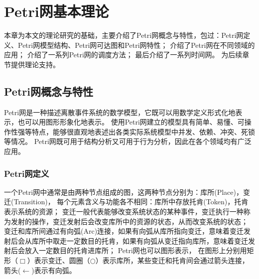\chapter{Petri网基本理论}
本章为本文的理论研究的基础，主要介绍了Petri网概念与特性，包过：Petri网定义、Petri网模型结构、Petri网可达图和Petri网特性；
介绍了Petri网在不同领域的应用；
介绍了一系列Petri网的调度方法；
最后介绍了一系列时间网。
为后续章节提供理论支持。
\section{Petri网概念与特性}
    Petri网是一种描述离散事件系统的数学模型，它既可以用数学定义形式化地表示，也可以用图形形象化地表示。
    使用Petri网建立的模型具有简单、易懂、可操作性强等特点，能够很直观地表述出各类实际系统模型中并发、依赖、冲突、死锁等情况。
    Petri网既可用于结构分析又可用于行为分析，因此在各个领域均有广泛应用\cite{24143}\cite{7426418}\cite{wu:hal-00735482}。

    \subsection{Petri网定义}
    一个Petri网中通常是由两种节点组成的图，这两种节点分别为：库所(Place)，变迁(Transition)，
    每个元素含义与功能各不相同：库所中存放托肯(Token)，托肯表示系统的资源；
    变迁一般代表能够改变系统状态的某种事件，变迁执行一种称为发射的操作，变迁发射后会改变库所中的资源的状态，从而改变系统的状态；
    变迁和库所间通过有向弧(Arc)连接，如果有向弧从库所指向变迁，意味着变迁发射后会从库所中取走一定数目的托肯，如果有向弧从变迁指向库所，意味着变迁发射后会放入一定数目的托肯进库所；
    Petri网也可以图形表示，
    在图形上分别用矩形（$\Box $）表示变迁、圆圈（$\bigcirc $）表示库所，某些变迁和托肯间会通过箭头连接，箭头($\leftarrow$)表示有向弧。

